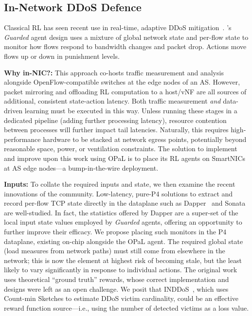 \documentclass[
sigconf,natbib=false
,anonymous=true
,10pt
]{acmart}
\newcommand{\fakepara}[1]{\noindent\textbf{#1:}}
\newcommand{\approachshort}{OPaL}
\begin{document}

\subsection{In-Network DDoS Defence}\label{sec:integ-1}
Classical RL has seen recent use in real-time, adaptive DDoS mitigation~\parencite{DBLP:journals/tnsm/SimpsonRP20}.
's \emph{Guarded} agent design uses a mixture of global network state and per-flow state to monitor how flows respond to bandwidth changes and packet drop.
Actions move flows up or down in punishment levels.

\fakepara{Why in-NIC?}
This approach co-hosts traffic measurement and analysis alongside OpenFlow-compatible switches at the edge nodes of an AS.
However, packet mirroring and offloading RL computation to a host/vNF are all sources of additional, consistent state-action latency.
Both traffic measurement \emph{and} data-driven learning must be executed in this way.
Unless running these stages in a dedicated pipeline (adding further processing latency), resource contention between processes will further impact tail latencies.
Naturally, this requires high-performance hardware to be stacked at network egress points, potentially beyond reasonable space, power, or ventilation constraints.
The solution to implement and improve upon this work using \approachshort{} is to place its RL agents on SmartNICs at AS edge nodes---a bump-in-the-wire deployment.


\fakepara{Inputs}
To collate the required inputs and state, we then examine the recent innovations of the community.
Low-latency, pure-P4 solutions to extract and record per-flow TCP state directly in the dataplane such as Dapper~\parencite{DBLP:conf/sosr/GhasemiBR17} and Sonata~\parencite{DBLP:conf/sigcomm/GuptaHCFRW18} are well-studied.
In fact, the statistics offered by Dapper are a super-set of the local input state values employed by \emph{Guarded} agents, offering an opportunity to further improve their efficacy. 
We propose placing such monitors in the P4 dataplane, existing on-chip alongside the \approachshort{} agent.
The required global state (load measures from network paths) must still come from elsewhere in the network; this is now the element at highest risk of becoming stale, but the least likely to vary significantly in response to individual actions.
The original work uses theoretical ``ground truth'' rewards, whose correct implementation and designs were left as an open challenge. 
We posit that INDDoS~\parencite{tnms-ddos-victim-ident}, which uses Count-min Sketches to estimate DDoS victim cardinality, could be an effective reward function source---i.e., using the number of detected victims as a loss value.
\end{document}
